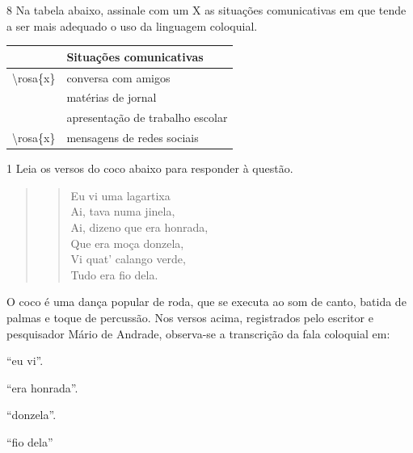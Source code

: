\num{8} Na tabela abaixo, assinale com um X as situações comunicativas em que tende a ser mais adequado
o uso da linguagem coloquial.

\begin{table}[]
\begin{tabular}{l|l|}
\cline{2-2}
 & \textbf{Situações comunicativas} \\ \hline
\multicolumn{1}{|l|}{\textbackslash{}rosa\{x\}} & conversa com amigos \\ \hline
\multicolumn{1}{|l|}{} & matérias de jornal \\ \hline
\multicolumn{1}{|l|}{} & apresentação de trabalho escolar \\ \hline
\multicolumn{1}{|l|}{\textbackslash{}rosa\{x\}} & mensagens de redes sociais \\ \hline
\end{tabular}
\end{table}


\num{1} Leia os versos do coco abaixo para responder à questão.

\begin{quote}
\begin{verse}

Eu vi uma lagartixa \\
Ai, tava numa jinela, \\
Ai, dizeno que era honrada, \\
Que era moça donzela, \\
Vi quat' calango verde, \\
Tudo era fio dela. 

\end{verse}
\end{quote}


O coco é uma dança popular de roda, que se executa ao som de canto, batida de palmas e 
toque de percussão. Nos versos acima, registrados pelo escritor e pesquisador Mário de 
Andrade, observa-se a transcrição da fala coloquial em:

\begin{escolha}
  
  \item ``eu vi''.
  
  \item ``era honrada''.
  
  \item ``donzela''.
  
  \item ``fio dela''

\end{escolha}


